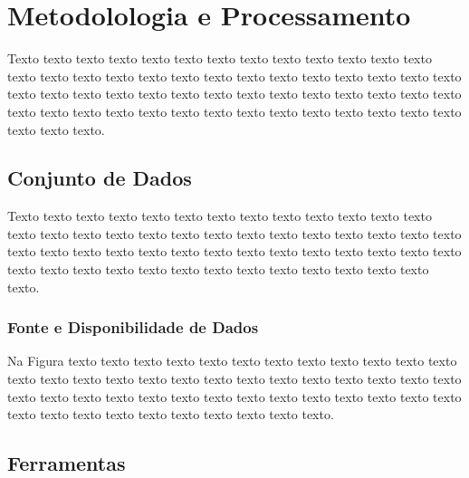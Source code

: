 \chapter{Metodolologia e Processamento}
\label{cap:processamento}

Texto texto texto texto texto texto texto texto texto texto texto texto texto
texto texto texto texto texto texto texto texto texto texto texto texto texto
texto texto texto texto texto texto texto texto texto texto texto texto texto
texto texto texto texto texto texto texto texto texto texto texto texto texto
texto texto texto texto texto texto.

\section{Conjunto de Dados}
\label{sec:fundamentos}

Texto texto texto texto texto texto texto texto texto texto texto texto texto
texto texto texto texto texto texto texto texto texto texto texto texto texto
texto texto texto texto texto texto texto texto texto texto texto texto texto
texto texto texto texto texto texto texto texto texto texto texto texto texto
texto texto texto.

\subsection{Fonte e Disponibilidade de
Dados}
\label{sec:acidos_nucleicos}

Na Figura texto texto texto texto texto texto texto texto
texto texto texto texto texto texto texto texto texto texto texto texto texto
texto texto texto texto texto texto texto texto texto texto texto texto texto
texto texto texto texto texto texto texto texto texto texto texto texto texto
texto texto texto.



\section{Ferramentas}
\label{sec:fundamentos}

